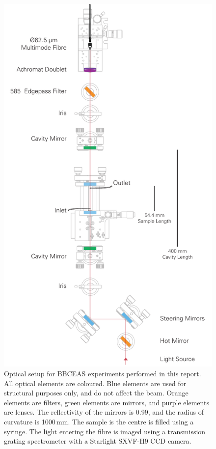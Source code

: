 \begin{figure}
\begin{center}
\includegraphics[]{figures/bbceas_setup/bbceas_setup_vertical.pdf}
\end{center}
\caption[BBCEAS Setup]{Optical setup for \ac{BBCEAS} experiments performed in this report. All optical elements are coloured. Blue elements are used for structural purposes only, and do not affect the beam. Orange elements are filters, green elements are mirrors, and purple elements are lenses. The reflectivity of the mirrors is 0.99, and the radius of curvature is 1000\,mm. The sample is the centre is filled using a syringe. The light entering the fibre is imaged using a transmission grating spectrometer with a Starlight SXVF-H9 \ac{CCD} camera.}
\label{fig:optical_layout}
\end{figure}


